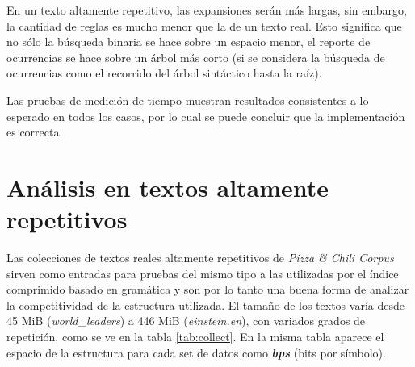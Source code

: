 En un texto altamente repetitivo, las expansiones serán más largas, sin embargo, la cantidad de reglas es mucho menor que la de un texto real. Esto significa que no sólo la búsqueda binaria se hace sobre un espacio menor, el reporte de ocurrencias se hace sobre un árbol más corto (si se considera la búsqueda de ocurrencias como el recorrido del árbol sintáctico hasta la raíz).

Las pruebas de medición de tiempo muestran resultados consistentes a lo esperado en todos los casos, por lo cual se puede concluir que la implementación es correcta. 

\newpage
\section{Análisis en textos altamente repetitivos}
\label{sect:repet}

Las colecciones de textos reales altamente repetitivos de \textit{Pizza \& Chili Corpus}\cite{pizzachili_repcorpus} sirven como entradas para pruebas del mismo tipo a las utilizadas por el índice comprimido basado en gramática\cite{claude2020} y son por lo tanto una buena forma de analizar la competitividad de la estructura utilizada. El tamaño de los textos varía desde 45 MiB (\textit{world\_leaders}) a 446 MiB (\textit{einstein.en}), con variados grados de repetición, como se ve en la tabla \ref{tab:collect}. En la misma tabla aparece el espacio de la estructura para cada set de datos como \textbf{\textit{bps}} (bits por símbolo). 

